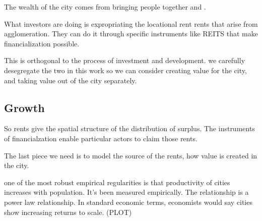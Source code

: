 \documentclass[]{article}
\begin{document}
The wealth of the city comes from bringing people together and . %

What investors are doing is expropriating the locational rent rents that arise from agglomeration.
They can do it through specific instruments like REITS that make financialization possible.

This is orthogonal to the process of investment and development. %
we carefully desegregate the two in this work so we can consider creating value for the city, and taking value out of the city separately. 




\subsection{Growth}

So rents give the spatial structure of the distribution of surplus.
The instruments of financialzation enable particular actors to claim those rents.

The last piece we need is to model the source of the rents, 
how value is created in the city. 

one of the most robust empirical regularities is that 
productivity of cities increases with population. It's been measured empirically. The relationship is a power law relationship.
In  standard economic terms, economists would say cities show increasing returns to scale. (PLOT)
\end{document}
